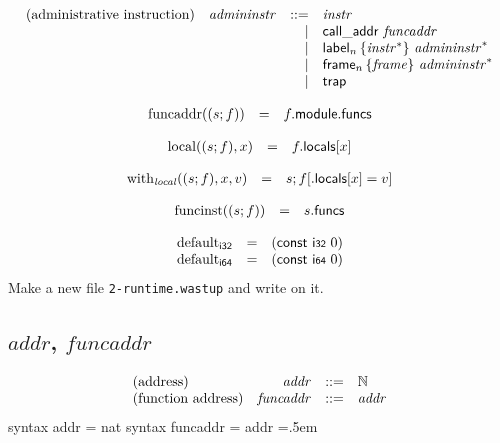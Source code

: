 \documentclass{article}
\newenvironment{lcverbatim}
 {\SaveVerbatim{cverb}}
 {\endSaveVerbatim
  \flushleft\fboxrule=0pt\fboxsep=.5em
  \colorbox{cverbbg}{%
    \makebox[\dimexpr\linewidth-2\fboxsep][l]{\BUseVerbatim{cverb}}%
  }
  \endflushleft
}
\newcommand\K[1]{\texttt{#1}}
\begin{document}
\vspace{1ex}

$$
\begin{array}{@{}lrrl@{}l@{}}
	\mbox{(administrative instruction)} & {\mathit{admininstr}} &::=& {\mathit{instr}} \\ &&|&
	\mathsf{call\_addr}~{\mathit{funcaddr}} \\ &&|&
	{\mathsf{label}}_{n}\,\{ {{\mathit{instr}}^\ast} \}~{{\mathit{admininstr}}^\ast} \\ &&|&
	{\mathsf{frame}}_{n}\,\{ {\mathit{frame}} \}~{{\mathit{admininstr}}^\ast} \\ &&|&
	\mathsf{trap} \\
\end{array}
$$

$$
\begin{array}{@{}lcl@{}l@{}}
	{\mathrm{funcaddr}}((s ; f)) &=& f{.}\mathsf{module}{.}\mathsf{funcs} \\
\end{array}
$$

\vspace{1ex}

$$
\begin{array}{@{}lcl@{}l@{}}
	{\mathrm{local}}((s ; f), x) &=& f{.}\mathsf{locals}{}[x] \\
\end{array}
$$

$$
\begin{array}{@{}lcl@{}l@{}}
	{\mathrm{with}}_{\mathit{local}}((s ; f), x, v) &=& s ; f{}[{.}\mathsf{locals}{}[x] = v] \\
\end{array}
$$

$$
\begin{array}{@{}lcl@{}l@{}}
	{\mathrm{funcinst}}((s ; f)) &=& s{.}\mathsf{funcs} \\
\end{array}
$$

$$
\begin{array}{@{}lcl@{}l@{}}
	{{\mathrm{default}}}_{\mathsf{i{\scriptstyle 32}}} &=& (\mathsf{const}~\mathsf{i{\scriptstyle 32}}~0) \\
	{{\mathrm{default}}}_{\mathsf{i{\scriptstyle 64}}} &=& (\mathsf{const}~\mathsf{i{\scriptstyle 64}}~0) \\
\end{array}
$$
Make a new file \K{2-runtime.wastup} and write on it. \\

\subsection{$addr$, $funcaddr$}
$$
\begin{array}{@{}lrrl@{}l@{}}
	\mbox{(address)} & {\mathit{addr}} &::=& \mathbb{N} \\
	\mbox{(function address)} & {\mathit{funcaddr}} &::=& {\mathit{addr}} \\
\end{array}
$$
\begin{lcverbatim}
syntax addr = nat
syntax funcaddr = addr
\end{lcverbatim}
\end{document}

